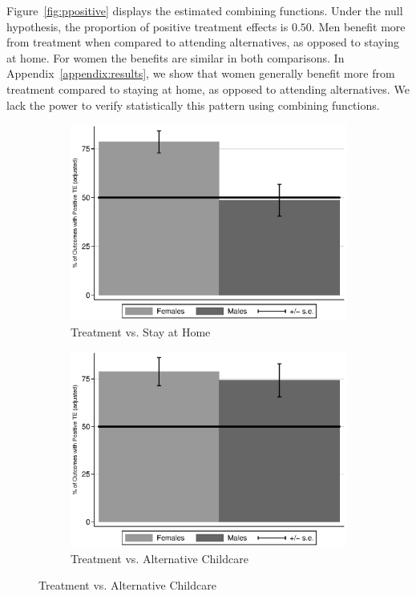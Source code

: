 Figure~\ref{fig:ppositive} displays the estimated combining functions. Under the null hypothesis, the proportion of positive treatment effects is $0.50$. Men benefit more from treatment when compared to attending alternatives, as opposed to staying at home. For women the benefits are similar in both comparisons. In Appendix~\ref{appendix:results}, we show that women generally benefit more from treatment compared to staying at home, as opposed to attending alternatives. We lack the power to verify statistically this pattern using combining functions. 


\begin{figure}
\centering
\caption{Positively Impacted Outcomes, ABC/CARE Males and Females}\label{fig:ppositive}
\begin{subfigure}[h]{0.49\textwidth}
		\centering
		\caption{ Treatment vs. Stay at Home} \label{fig:ppositivehome}
		\includegraphics[width=\textwidth]{output/epan_ipw_p0_all.eps}
\end{subfigure}%
\begin{subfigure}[h]{0.49\textwidth}
	\centering
	\caption{Treatment vs. Alternative Childcare} \label{fig:ppositivealternative}
		\includegraphics[width=\textwidth]{output/epan_ipw_p1_all.eps}

\end{subfigure}
\end{figure}
